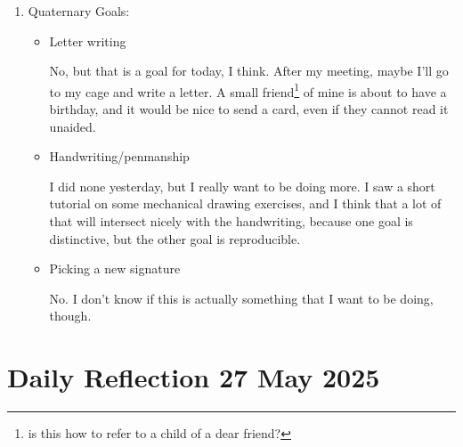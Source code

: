 \documentclass[12pt]{article}
\renewcommand{\,}{\textsuperscript{,}}
\begin{document}
\begin{enumerate}
\begin{itemize}
\end{itemize}

\item Quaternary Goals:

\begin{itemize}

\item Letter writing

No, but that is a goal for today, I think.  
After my meeting, maybe I'll go to my cage and write a letter. A small friend\footnote{is this how to refer to a child of a dear friend?} of mine is about to have a birthday, and it would be nice to send a card, even if they cannot read it unaided.

\item Handwriting/penmanship

I did none yesterday, but I really want to be doing more.  
I saw a short tutorial on some mechanical drawing exercises, and I think that a lot of that will intersect nicely with the handwriting, because one goal is distinctive, but the other goal is reproducible.

\item Picking a new signature

No. I don't know if this is actually something that I want to be doing, though.

\end{itemize}

\end{enumerate}

\section{Daily Reflection 27 May 2025}
\end{document}
